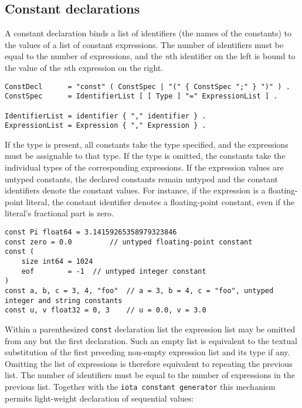 {\subsection*{Constant declarations}

A constant declaration binds a list of identifiers (the names of the
constants) to the values of a list of
constant expressions. The number of
identifiers must be equal to the number of expressions, and the
\emph{n}th identifier on the left is bound to the value of the
\emph{n}th expression on the right.

\begin{Verbatim}[frame=single]
ConstDecl      = "const" ( ConstSpec | "(" { ConstSpec ";" } ")" ) .
ConstSpec      = IdentifierList [ [ Type ] "=" ExpressionList ] .

IdentifierList = identifier { "," identifier } .
ExpressionList = Expression { "," Expression } .
\end{Verbatim}

If the type is present, all constants take the type specified, and the
expressions must be assignable to that type.
If the type is omitted, the constants take the individual types of the
corresponding expressions. If the expression values are untyped
constants, the declared constants remain untyped
and the constant identifiers denote the constant values. For instance,
if the expression is a floating-point literal, the constant identifier
denotes a floating-point constant, even if the literal's fractional part
is zero.

\begin{Verbatim}[frame=single]
const Pi float64 = 3.14159265358979323846
const zero = 0.0         // untyped floating-point constant
const (
    size int64 = 1024
    eof        = -1  // untyped integer constant
)
const a, b, c = 3, 4, "foo"  // a = 3, b = 4, c = "foo", untyped integer and string constants
const u, v float32 = 0, 3    // u = 0.0, v = 3.0
\end{Verbatim}

Within a parenthesized \texttt{const} declaration list the expression
list may be omitted from any but the first declaration. Such an empty
list is equivalent to the textual substitution of the first preceding
non-empty expression list and its type if any. Omitting the list of
expressions is therefore equivalent to repeating the previous list. The
number of identifiers must be equal to the number of expressions in the
previous list. Together with the \texttt{iota constant
generator} this mechanism permits light-weight declaration of sequential
values:

}
